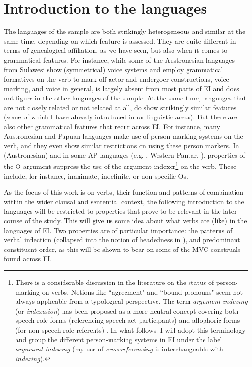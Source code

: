 \section{Introduction to the languages}\label{introlang}

The languages of the sample are both strikingly heterogeneous and similar at the same time, depending on which feature is assessed. They are quite different in terms of genealogical affiliation, as we have seen, but also when it comes to grammatical features. For instance, while some of the Austronesian languages from Sulawesi show (symmetrical) voice systems and employ grammatical formatives on the verb to mark off actor and undergoer constructions, voice marking, and voice in general, is largely absent from most parts of EI and does not figure in the other languages of the sample. At the same time, languages that are not closely related or not related at all, do show strikingly similar features (some of which I have already introduced in  on linguistic areas). But there are also other grammatical features that recur across EI. For instance, many Austronesian and Papuan languages make use of person-marking systems on the verb, and they even show similar restrictions on using these person markers. In  (Austronesian) and in some AP languages (e.g. , Western Pantar, ), properties of the O argument suppress the use of the argument indexer\footnote{There is a considerable discussion in the literature on the status of person-marking on verbs. Notions like ``agreement" and ``bound pronouns" seem not always applicable from a typological perspective. The term \textit{argument indexing} (or \textit{indexation}) has been proposed as a more neutral concept covering both speech-role forms (referencing speech act participants) and allophoric forms (for non-speech role referents) \parencite{haspelmath2013argument}. In what follows, I will adopt this terminology and group the different person-marking systems in EI under the label \textit{argument indexing} (my use of \textit{crossreferencing} is interchangeable with \textit{indexing}).} on the verb. These include, for instance, inanimate, indefinite, or non-specific Os. 

As the focus of this work is on verbs, their function and patterns of combination within the wider clausal and sentential context, the following introduction to the languages will be restricted to properties that prove to be relevant in the later course of the study. This will give us some idea about what verbs are (like) in the languages of EI. Two properties are of particular importance: the patterns of verbal inflection (collapsed into the notion of headedness in ), and predominant constituent order, as this will be shown to bear on some of the MVC construals found across EI.

